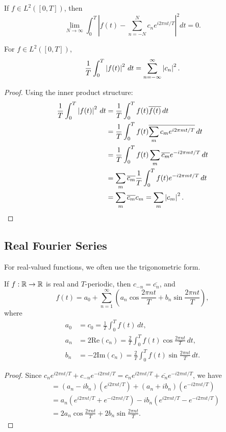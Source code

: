 \begin{notechapter}
\begin{theorem}
If $f \in L^2([0,T])$, then
\[
\lim_{N \to \infty} \int_0^T \left| f(t) - \sum_{n=-N}^{N} c_n e^{i 2\pi n t/T} \right|^2 dt = 0.
\]
\end{theorem}

\begin{theorem}
For $f \in L^2([0,T])$,
\[
\frac{1}{T} \int_0^T \left|f(t)\right|^2 \, dt = \sum_{n=-\infty}^{\infty} \left|c_n\right|^2.
\]
\end{theorem}

\begin{proof}
Using the inner product structure:
\begin{align*}
\frac{1}{T} \int_0^T \left|f(t)\right|^2 \, dt &= \frac{1}{T} \int_0^T f(t) \overline{f(t)} \, dt \\
&= \frac{1}{T} \int_0^T f(t) \overline{\sum_{m} c_m e^{i 2\pi m t/T}} \, dt \\
&= \frac{1}{T} \int_0^T f(t) \sum_{m} \overline{c_m} e^{-i 2\pi m t/T} \, dt \\
&= \sum_{m} \overline{c_m} \frac{1}{T} \int_0^T f(t) e^{-i 2\pi m t/T} \, dt \\
&= \sum_{m} \overline{c_m} c_m = \sum_{m} \left|c_m\right|^2.
\end{align*}
\end{proof}

\subsection{Real Fourier Series}

For real-valued functions, we often use the trigonometric form.

\begin{proposition}
If $f:\mathbb{R} \to \mathbb{R}$ is real and $T$-periodic, then $c_{-n} = \overline{c_n}$, and
\[
f(t) = a_0 + \sum_{n=1}^{\infty} \left( a_n \cos\frac{2\pi n t}{T} + b_n \sin\frac{2\pi n t}{T} \right),
\]
where
\begin{align*}
a_0 &= c_0 = \frac{1}{T} \int_0^T f(t) \, dt, \\
a_n &= 2\text{Re}(c_n) = \frac{2}{T} \int_0^T f(t) \cos\frac{2\pi n t}{T} \, dt, \\
b_n &= -2\text{Im}(c_n) = \frac{2}{T} \int_0^T f(t) \sin\frac{2\pi n t}{T} \, dt.
\end{align*}
\end{proposition}

\begin{proof}
Since $c_n e^{i 2\pi n t/T} + c_{-n} e^{-i 2\pi n t/T} = c_n e^{i 2\pi n t/T} + \overline{c_n} e^{-i 2\pi n t/T}$, we have
\begin{align*}
&= (a_n - ib_n)(e^{i 2\pi n t/T}) + (a_n + ib_n)(e^{-i 2\pi n t/T}) \\
&= a_n(e^{i 2\pi n t/T} + e^{-i 2\pi n t/T}) - ib_n(e^{i 2\pi n t/T} - e^{-i 2\pi n t/T}) \\
&= 2a_n \cos\frac{2\pi n t}{T} + 2b_n \sin\frac{2\pi n t}{T}.
\end{align*}
\end{proof}


\end{notechapter}

